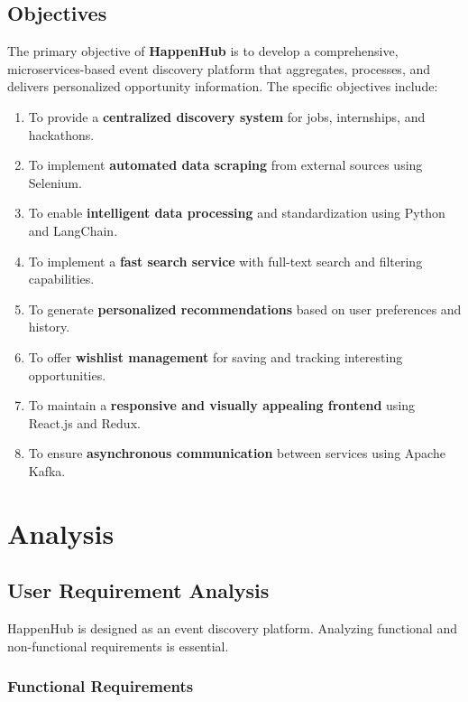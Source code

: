 \documentclass[12pt, a4paper]{report}
\begin{document}
\section{Objectives} %
The primary objective of \textbf{HappenHub} is to develop a comprehensive, microservices-based event discovery platform that aggregates, processes, and delivers personalized opportunity information. The specific objectives include:
\begin{enumerate}
    \item To provide a \textbf{centralized discovery system} for jobs, internships, and hackathons.
    \item To implement \textbf{automated data scraping} from external sources using Selenium.
    \item To enable \textbf{intelligent data processing} and standardization using Python and LangChain.
    \item To implement a \textbf{fast search service} with full-text search and filtering capabilities.
    \item To generate \textbf{personalized recommendations} based on user preferences and history.
    \item To offer \textbf{wishlist management} for saving and tracking interesting opportunities.
    \item To maintain a \textbf{responsive and visually appealing frontend} using React.js and Redux.
    \item To ensure \textbf{asynchronous communication} between services using Apache Kafka.
\end{enumerate}

\chapter{Analysis} %

\section{User Requirement Analysis}
HappenHub is designed as an event discovery platform. Analyzing functional and non-functional requirements is essential.

\subsection{Functional Requirements}
\end{document}
